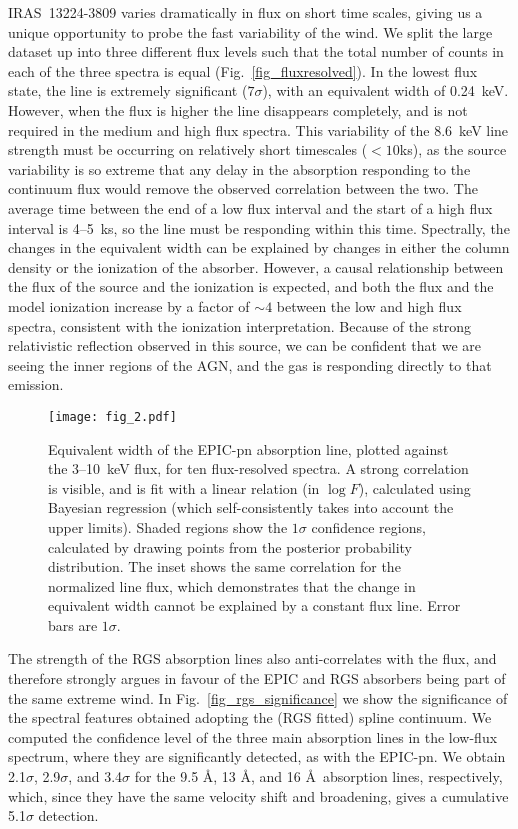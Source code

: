 \documentclass[10pt, a4paper]{article}
\begin{document}
IRAS~13224-3809 varies dramatically in flux on short time scales, giving us a unique opportunity to probe the fast variability of the wind. We split the large dataset up into three different flux levels such that the total number of counts in each of the three spectra is equal (Fig.~\ref{fig_fluxresolved}). In the lowest flux state, the line is extremely significant ($7\sigma$), with an equivalent width of 0.24~keV. However, when the flux is higher the line disappears completely, and is not required in the medium and high flux spectra.
This variability of the 8.6~keV line strength must be occurring on relatively short timescales ($<10$ks), as the source variability is so extreme that any delay in the absorption responding to the continuum flux would remove the observed correlation between the two. The average time between the end of a low flux interval and the start of a high flux interval is 4--5~ks, so the line must be responding within this time. Spectrally, the changes in the equivalent width can be explained by changes in either the column density or the ionization of the absorber. However, a causal relationship between the flux of the source and the ionization is expected, and both the flux and the model ionization increase by a factor of $\sim4$ between the low and high flux spectra, consistent with the ionization interpretation. Because of the strong relativistic reflection observed in this source, we can be confident that we are seeing the inner regions of the AGN, and the gas is responding directly to that emission.

\begin{figure}[t]
\centering
\texttt{[image: fig\_2.pdf]}
\caption{ Equivalent width of the EPIC-pn absorption line, plotted against the 3--10~keV flux, for ten flux-resolved spectra. A strong correlation is visible, and is fit with a linear relation (in $\log{F}$), calculated using Bayesian regression (which self-consistently takes into account the upper limits). Shaded regions show the $1\sigma$ confidence regions, calculated by drawing points from the posterior probability distribution. The inset shows the same correlation for the normalized line flux, which demonstrates that the change in equivalent width cannot be explained by a constant flux line. Error bars are $1\sigma$.}
\label{fig_linestrength}
\end{figure}

The strength of the RGS absorption lines also anti-correlates with the flux, and therefore strongly argues in favour of the EPIC and RGS absorbers being part of the same extreme wind. In Fig.~\ref{fig_rgs_significance} we show the significance of the spectral features obtained adopting the (RGS fitted) spline continuum. We computed the confidence level of the three main absorption lines in the low-flux spectrum, where they are significantly detected, as with the EPIC-pn. We obtain 2.1$\sigma$, 2.9$\sigma$, and 3.4$\sigma$ for the 9.5 \AA , 13 \AA , and 16 \AA\ absorption lines, respectively, which, since they have the same velocity shift and broadening, gives a cumulative 5.1$\sigma$ detection.
\end{document}
